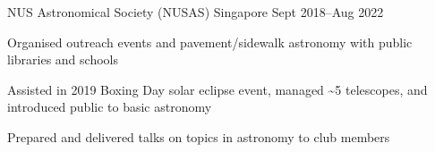 \begin{cventries}
	{NUS Astronomical Society (NUSAS)} %
	{Singapore} %
	{Sept 2018--Aug 2022} %
	{
		\begin{cvitems} %
			\item Organised outreach events and pavement/sidewalk astronomy with public libraries and schools
			\item Assisted in 2019 Boxing Day solar eclipse event, managed \textasciitilde5 telescopes, and introduced public to basic astronomy
			\item Prepared and delivered talks on topics in astronomy to club members
		\end{cvitems}
	}

\end{cventries}
